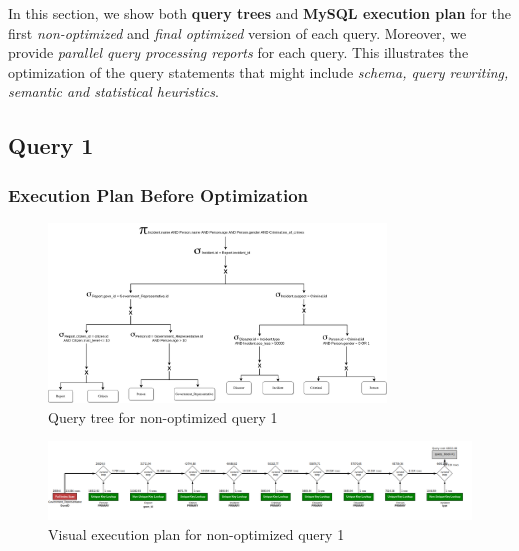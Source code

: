 In this section, we show both \textbf{query trees} and \textbf{MySQL execution plan} for the first \emph{non-optimized} and \emph{final optimized} version of each query. Moreover, we provide \emph{parallel query processing reports} for each query. This illustrates the optimization of the query statements that might include \emph{schema, query rewriting, semantic and statistical heuristics}.

\subsection{Query 1}

\subsubsection{Execution Plan Before Optimization}
\begin{figure}[H]
    \centering
    \includegraphics[width=0.8\textwidth]{images/query_trees/query1-non-optimized.png}
    \caption{Query tree for non-optimized query 1}
\end{figure}
\begin{figure}[H]
    \centering
    \includegraphics[width=\textwidth]{images/execution_plans/q1-1-old.png}
    \caption{Visual execution plan for non-optimized query 1}
\end{figure}

